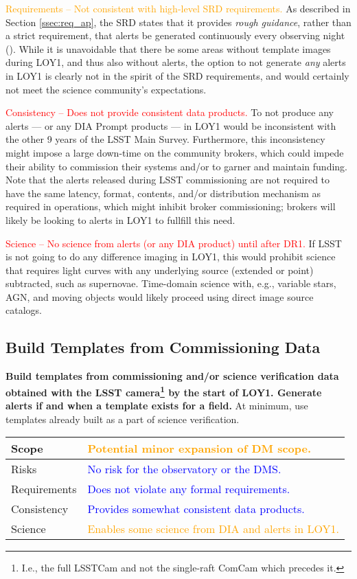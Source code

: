 \documentclass[DM,toc]{lsstdoc}
\begin{document}
\textcolor{orange}{ Requirements -- Not consistent with high-level SRD requirements.}
As described in Section \ref{ssec:req_ap}, the SRD states that it provides {\it rough guidance}, rather than a strict requirement, that alerts be generated continuously every observing night (). 
While it is unavoidable that there be some areas without template images during LOY1, and thus also without alerts, the option to not generate {\it any} alerts in LOY1 is clearly not in the spirit of the SRD requirements, and would certainly not meet the science community's expectations. 

\textcolor{red}{ Consistency -- Does not provide consistent data products.}
To not produce any alerts --- or any DIA Prompt products --- in LOY1 would be inconsistent with the other 9 years of the LSST Main Survey.
Furthermore, this inconsistency might impose a large down-time on the community brokers, which could impede their ability to commission their systems and/or to garner and maintain funding.
Note that the alerts released during LSST commissioning are not required to have the same latency, format, contents, and/or distribution mechanism as required in operations, which might inhibit broker commissioning;  brokers will likely be looking to alerts in LOY1 to fullfill this need.

\textcolor{red}{ Science -- No science from alerts (or any DIA product) until after DR1.}
If LSST is not going to do any difference imaging in LOY1, this would prohibit science that requires light curves with any underlying source (extended or point) subtracted, such as supernovae.
Time-domain science with, e.g., variable stars, AGN, and moving objects would likely proceed using direct image source catalogs. 


\clearpage
\subsection{Build Templates from Commissioning Data}\label{ssec:potsol_comm}

{\bf Build templates from commissioning and/or science verification data obtained with the LSST camera\footnote{I.e., the full LSSTCam and not the single-raft ComCam which precedes it.} by the start of LOY1. Generate alerts if and when a template exists for a field.} At minimum, use templates already built as a part of science verification.

\begin{center}
\begin{tabular}{|p{2.5cm}|p{13cm}|}
\hline
Scope & \textcolor{orange}{Potential minor expansion of DM scope.}   \\
\hline
Risks & \textcolor{blue}{No risk for the observatory or the DMS.} \\
\hline
Requirements & \textcolor{blue}{Does not violate any formal requirements.} \\
\hline
Consistency & \textcolor{blue}{Provides somewhat consistent data products.}  \\
\hline
Science & \textcolor{orange}{Enables some science from DIA and alerts in LOY1.} \\
\hline
\end{tabular}
\end{center}
\end{document}
